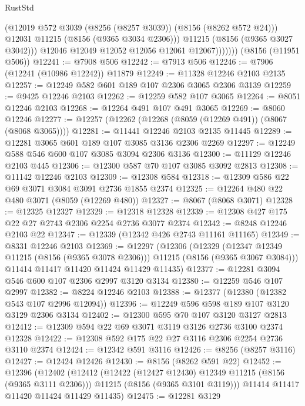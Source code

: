 \begin{lexlean}{RustStd}
\begin{coremodule}
                      (@12019 @572 @3039 (@8256 (@8257 @3039)) (@8156 (@8262 @572 @24)))
                      @12031
                      @11215
                      (@8156 (@9365 @3034 @2306)))
                    @11215
                    (@8156 (@9365 @3027 @3042)))
                  @12046
                  @12049
                  @12052
                  @12056
                  @12061
                  @12067)))))))
    (@8156 (@11951 @506))
@12241 := @7908 @506
@12242 := @7913 @506
@12246 := @7906 (@12241 (@10986 @12242)) @11879
@12249 := @11328 @12246 @2103 @2135
@12257 := @12249 @582 @601 @189 @107 @2306 @3065 @2306 @3139
@12259 := @9425 @12246 @2103
@12262 := @12259 @582 @107 @3065
@12264 := @8051 @12246 @2103
@12268 := @12264 @491 @107 @491 @3065
@12269 := @8060 @12246
@12277 := @12257 (@12262 (@12268 (@8059 (@12269 @491)) (@8067 (@8068 @3065))))
@12281 := @11441 @12246 @2103 @2135 @11445
@12289 := @12281 @3065 @601 @189 @107 @3085 @3136 @2306 @2269
@12297 := @12249 @588 @546 @600 @107 @3085 @3094 @2306 @3136
@12300 := @11129 @12246 @2103 @445
@12306 := @12300 @587 @70 @107 @3085 @3092 @2813
@12308 := @11142 @12246 @2103
@12309 := @12308 @584
@12318 := @12309 @586 @22 @69 @3071 @3084 @3091 @2736 @1855 @2374
@12325 := @12264 @480 @22 @480 @3071 (@8059 (@12269 @480))
@12327 := @8067 (@8068 @3071)
@12328 := @12325 @12327
@12329 := @12318 @12328
@12339 := @12308 @427 @175 @22 @27 @2743 @2306 @2254 @2736 @3077 @2374
@12342 := @8248 @12246 @2103 @22
@12347 := @12339 (@12342 @426 @2743 @11161 @11165)
@12349 := @8331 @12246 @2103
@12369 := @12297
    (@12306
      (@12329 (@12347 @12349 @11215 (@8156 (@9365 @3078 @2306))) @11215 (@8156 (@9365 @3067 @3084)))
      @11414
      @11417
      @11420
      @11424
      @11429
      @11435)
@12377 := @12281 @3094 @546 @600 @107 @2306 @2997 @3120 @3134
@12380 := @12259 @546 @107 @2997
@12382 := @8224 @12246 @2103
@12388 := @12377 (@12380 (@12382 @543 @107 @2996 @12094))
@12396 := @12249 @596 @598 @189 @107 @3120 @3129 @2306 @3134
@12402 := @12300 @595 @70 @107 @3120 @3127 @2813
@12412 := @12309 @594 @22 @69 @3071 @3119 @3126 @2736 @3100 @2374 @12328
@12422 := @12308 @592 @175 @22 @27 @3116 @2306 @2254 @2736 @3110 @2374
@12424 := @12342 @591 @3116
@12426 := @8256 (@8257 @3116)
@12427 := @12424 @12426
@12430 := @8156 (@8262 @591 @22)
@12452 := @12396
    (@12402
      (@12412
        (@12422 (@12427 @12430) @12349 @11215 (@8156 (@9365 @3111 @2306)))
        @11215
        (@8156 (@9365 @3101 @3119)))
      @11414
      @11417
      @11420
      @11424
      @11429
      @11435)
@12475 := @12281
    @3129

\end{coremodule}
\end{lexlean}
